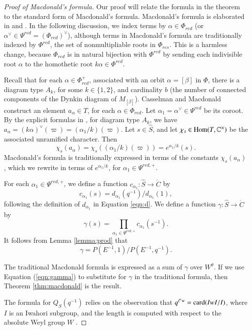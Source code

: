 \begin{proof}[Proof of Macdonald's formula]
  Our proof will relate the formula in the theorem to the standard
  form of Macdonald's formula.  Macdonald's formula is elaborated in
  \cite{casselman1980unramified} and \cite{casselman2005companion}.
  In the following discussion, we index terms by
  $\alpha\in\Phi_{red}$ (or $\alpha^\vee\in \Psi^{red} =
  (\Phi_{red})^\vee$), although terms in Macdonald's formula are
  traditionally indexed by $\Phi^{red}$, the set of nonmultipliable
  roots in $\Phi_{res}$.  This is a harmless change, because
  $\Phi_{red}$ is in natural bijection with $\Phi^{red}$ by
  sending each indivisible root $\alpha$ to the homothetic root
  $k\alpha\in\Phi^{red}$.

  Recall that for each $\alpha\in \Phi^+_{red}$, associated with an
  orbit $\alpha=[\beta]$ in $\Phi$, there is a diagram type $A_k$, for
  some $k\in\{1,2\}$, and cardinality $b$ (the number of connected
  components of the Dynkin diagram of $M_{[\beta]}$).  Casselman and
  Macdonald construct an element $a_{\alpha}\in T$, for each
  $\alpha\in\Phi_{red}$.  Let $\alpha_1 = \alpha^\vee\in \Psi^{red}$
  be its coroot.  By the explicit formulas in
  \cite{casselman2005companion}, for diagram type $A_k$, we have
  $a_\alpha = (k\alpha)^\vee(\varpi) = (\alpha_1/k)(\varpi)$.  Let
  $s\in \hat S$, and let $\chi_s\in{\operatorname{Hom}}(T,\mathbb{C}^\times)$ be the
  associated unramified character.  Then
\[
\chi_s(a_{\alpha}) = \chi_s((\alpha_1/k)(\varpi)) = e^{\alpha_1/k}(s).
\]
Macdonald's formula is traditionally expressed in terms of the
constants $\chi_s(a_\alpha)$, which we rewrite in terms of
$e^{\alpha_1/k}$, for $\alpha_1\in\Psi^{red,+}$.

For each $\alpha_1\in\Psi^{red,+}$, we define a function
$c_{\alpha_1}:\hat S\to\ring{C}$ by
\[
c_{\alpha_1}(s) = d_{\alpha_1}(q^{-1})/d_{\alpha_1}(1),
\]
following the definition of $d_{\alpha_1}$ in Equation \ref{eqn:d}.
We define a function $\gamma:\hat S\to \ring{C}$ by
\[
\gamma(s)  = \prod_{\alpha_1\in \Psi^{red,+}} c_{\alpha_1}(s^{-1}).
\]
It follows from Lemma \ref{lemma:prod} that
\begin{equation}\label{eqn:gamma}
\gamma = P(E^{-1},1)/P(E^{-1},q^{-1}).
\end{equation}

The traditional Macdonald formula is expressed as a sum of $\gamma$
over $W^\theta$.  If we use Equation (\ref{eqn:gamma}) to substitute
for $\gamma$ in the traditional formula, then Theorem
\ref{thm:macdonald} is the result.

The formula for $Q_S(q^{-1})$ relies on the observation that $q^{\ell'
  w} = {\operatorname{card}}(IwI/I)$, where $I$ is an Iwahori subgroup, and the
length is computed with respect to the absolute Weyl group $W$
\cite[p.74]{carter1985finite}.
\end{proof}


